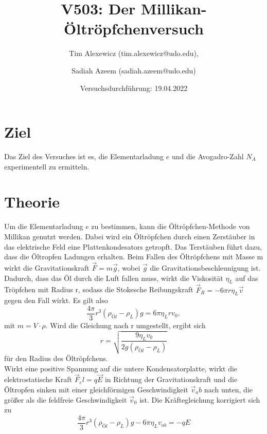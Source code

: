 \documentclass[a4paper]{scrartcl}
\begin{document}
\title{V503: Der Millikan-Öltröpfchenversuch}
\author{Tim Alexewicz (tim.alexewicz@udo.edu), \and Sadiah Azeem (sadiah.azeem@udo.edu)}
\date{Versuchsdurchführung: 19.04.2022}

\maketitle
\thispagestyle{empty}
\newpage
\thispagestyle{empty}
\tableofcontents
\newpage
\setcounter{page}{1}

\section{Ziel}
Das Ziel des Versuches ist es, die Elementarladung $e$ und die Avogadro-Zahl $N_A$ experimentell zu ermitteln.

\section{Theorie}
Um die Elementarladung $e$ zu bestimmen, kann die Öltröpfchen-Methode von Millikan genutzt werden. Dabei wird ein Öltröpfchen durch einen Zerstäuber in das elektrische Feld eine Plattenkondesators getropft. Das Terstäuben führt dazu, dass die Öltropfen Ladungen erhalten. Beim Fallen des Öltröpfchens mit Masse m wirkt die Gravitationskraft $\vec F=m\vec g$, wobei $\vec g$ die Gravitationsbeschleunigung ist. Dadurch, dass das Öl durch die Luft fallen muss, wirkt die Viskosität $\eta_L$ auf das Tröpfchen mit Radius r, sodass die Stokesche Reibungskraft $\vec F_R=-6\pi r\eta_L\vec v$ gegen den Fall wirkt. Es gilt also 
\begin{equation*}
  \frac{4\pi}{3}r^3(\rho_{Öl}-\rho_{L})g=6\pi\eta_{L} r v_{0},
\end{equation*}
mit $m=V\cdot\rho$. Wird die Gleichung nach r umgestellt, ergibt sich
\begin{equation*}
  r=\sqrt{\frac{9\eta_{L} v_{0}}{2g(\rho_{Öl}-\rho_{L})}}
\end{equation*}
für den Radius des Öltröpfchens.\\
Wirkt eine positive Spannung auf die untere Kondensatorplatte, wirkt die elektrostatische Kraft $\vec F_el=q\vec E$ in Richtung der Gravitationskraft und die Öltropfen sinken mit einer gleichförmigen Geschwindigkeit $\vec v_ab$ nach unten, die größer als die feldfreie Geschwindigkeit $\vec v_0$ ist. Die Kräftegleichung korrigiert sich zu
\begin{equation*}
  \frac{4\pi}{3}r^3(\rho_{Öl}-\rho_{L})g-6\pi\eta_{L}v_{ab}=-qE
\end{equation*}
\end{document}
